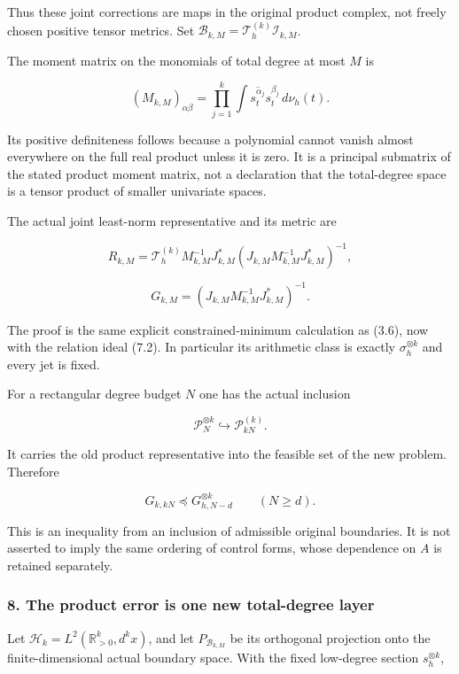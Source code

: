 Thus these joint corrections are maps in the original product complex,
not freely chosen positive tensor metrics. Set
\(\mathcal B_{k,M}=\mathcal T_h^{(k)}\mathcal I_{k,M}\).

The moment matrix on the monomials of total degree at most \(M\) is

\[\boxed{(M_{k,M})_{\alpha\beta}=\prod_{j=1}^k\int\overline{s_t^{\alpha_j}}s_t^{\beta_j}\,d\nu_h(t).}\tag{7.3}\]

Its positive definiteness follows because a polynomial cannot vanish
almost everywhere on the full real product unless it is zero. It is a
principal submatrix of the stated product moment matrix, not a
declaration that the total-degree space is a tensor product of smaller
univariate spaces.

The actual joint least-norm representative and its metric are

\[\boxed{R_{k,M}=\mathcal T_h^{(k)}M_{k,M}^{-1}J_{k,M}^*
(J_{k,M}M_{k,M}^{-1}J_{k,M}^*)^{-1},}\]

\[\boxed{G_{k,M}=(J_{k,M}M_{k,M}^{-1}J_{k,M}^*)^{-1}.}\tag{7.4}\]

The proof is the same explicit constrained-minimum calculation as (3.6),
now with the relation ideal (7.2). In particular its arithmetic class is
exactly \(\sigma_h^{\otimes k}\) and every jet is fixed.

For a rectangular degree budget \(N\) one has the actual inclusion

\[\mathcal P_N^{\otimes k}\hookrightarrow\mathcal P_{kN}^{(k)}.\]

It carries the old product representative into the feasible set of the
new problem. Therefore

\[G_{k,kN}\preceq G_{h,N-d}^{\otimes k}\qquad(N\ge d).\tag{7.5}\]

This is an inequality from an inclusion of admissible original
boundaries. It is not asserted to imply the same ordering of control
forms, whose dependence on \(A\) is retained separately.

\subsubsection{8. The product error is one new total-degree
layer}\label{pr_14:the-product-error-is-one-new-total-degree-layer}

Let \(\mathcal H_k=L^2(\mathbb R_{>0}^k,d^kx)\), and let
\(P_{\mathcal B_{k,M}}\) be its orthogonal projection onto the
finite-dimensional actual boundary space. With the fixed low-degree
section \(s_h^{\otimes k}\),

